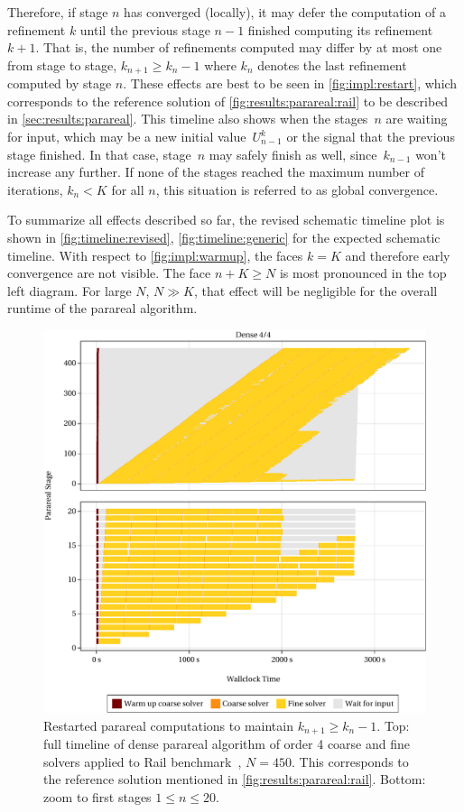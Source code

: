 Therefore, if stage $n$ has converged (locally),
it may defer the computation of a refinement $k$
until the previous stage $n-1$ finished computing its refinement $k+1$.
That is, the number of refinements computed may differ by at most one from stage to stage,
\ie $k_{n+1} \geq k_n -1$ where $k_n$ denotes the last refinement computed by stage $n$.
These effects are best to be seen in \autoref{fig:impl:restart},
which corresponds to the reference solution of \autoref{fig:results:parareal:rail} to be described in \autoref{sec:results:parareal}.
This timeline also shows when the stages~$n$ are waiting for input,
which may be a new initial value~$U_{n-1}^k$ or the signal that the previous stage finished.
In that case, stage~$n$ may safely finish as well,
since~$k_{n-1}$ won't increase any further.
If none of the stages reached the maximum number of iterations,
\ie $k_n < K$ for all $n$,
this situation is referred to as global convergence.

To summarize all effects described so far,
the revised schematic timeline plot is shown in \autoref{fig:timeline:revised},
\cf \autoref{fig:timeline:generic} for the expected schematic timeline.
With respect to \autoref{fig:impl:warmup},
the faces $k=K$ and therefore early convergence are not visible.
The face $n+K \geq N$ is most pronounced in the top left diagram.
For large $N$, $N \gg K$, that effect will be negligible for the overall runtime of the parareal algorithm.

\begin{figure}[tp]
  \centering
  \includegraphics[width=\textwidth]{figures/fig_timeline_ref.pdf}
  \caption[Restarted parareal computation]{
    Restarted parareal computations to maintain $k_{n+1} \geq k_n - 1$.
    Top: full timeline of dense parareal algorithm of order 4 coarse and fine solvers applied to Rail benchmark~\cite{morwiki_steel}, $N=450$.
    This corresponds to the reference solution mentioned in \autoref{fig:results:parareal:rail}.
    Bottom: zoom to first stages $1 \leq n \leq 20$.
  }
  \label{fig:impl:restart}
\end{figure}

